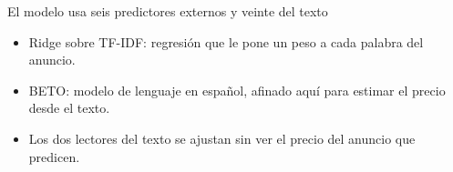 \documentclass[aspectratio=169,11pt]{beamer}
\begin{document}
\begin{frame}{El modelo usa seis predictores externos y veinte del texto}
  \centering\scriptsize
  
  \par\vspace{4pt}
  \begin{itemize}\small\setlength{\itemsep}{1pt}
    \item Ridge sobre TF-IDF: regresión que le pone un peso a cada palabra del anuncio.
    \item BETO: modelo de lenguaje en español, afinado aquí para estimar el precio desde el texto.
    \item Los dos lectores del texto se ajustan sin ver el precio del anuncio que predicen.
  \end{itemize}
\end{frame}
\end{document}
